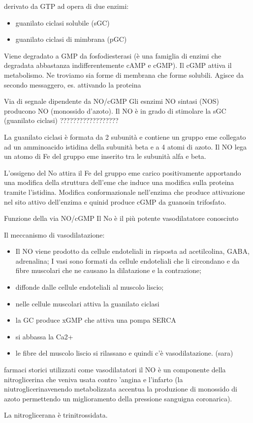 \documentclass[]{article}
\begin{document}
derivato da GTP ad opera di due enzimi:

\begin{itemize}
\itemsep1pt\parskip0pt
\item
  guanilato ciclasi solubile (sGC)
\item
  guanilato ciclasi di mimbrana (pGC)
\end{itemize}

Viene degradato a GMP da fosfodiesterasi (è una famiglia di enzimi che
degradata abbastanza indifferentemente cAMP e cGMP). Il cGMP attiva il
metabolismo. Ne troviamo sia forme di membrana che forme solubili.
Agisce da secondo messaggero, es. attivando la proteina

Via di segnale dipendente da NO/cGMP Gli esnzimi NO sintasi (NOS)
producono NO (monossido d'azoto). Il NO è in grado di stimolare la sGC
(guanilato ciclasi) ??????????????????

La guanilato ciclasi è formata da 2 subunità e contiene un gruppo eme
collegato ad un amminoacido istidina della subunità beta e a 4 atomi di
azoto. Il NO lega un atomo di Fe del gruppo eme inserito tra le subunità
alfa e beta.

L'ossigeno del No attira il Fe del gruppo eme carico positivamente
apportando una modifica della struttura dell'eme che induce una modifica
sulla proteina tramite l'istidina. Modifica conformazionale nell'enzima
che produce attivazione nel sito attivo dell'enzima e quinid produce
cGMP da guanosin trifosfato.

Funzione della via NO/cGMP Il No è il più potente vasodilatatore
conosciuto

Il meccanismo di vasodilatazione:

\begin{itemize}
\itemsep1pt\parskip0pt
\item
  Il NO viene prodotto da cellule endoteliali in risposta ad
  acetilcolina, GABA, adrenalina; I vasi sono formati da cellule
  endoteliali che li circondano e da fibre muscolari che ne causano la
  dilatazione e la contrazione;
\item
  diffonde dalle cellule endoteliali al muscolo liscio;
\item
  nelle cellule muscolari attiva la guanilato ciclasi
\item
  la GC produce xGMP che attiva una pompa SERCA
\item
  si abbassa la Ca2+
\item
  le fibre del muscolo liscio si rilassano e quindi c'è vasodilatazione.
  (sara)
\end{itemize}

farmaci storici utilizzati come vasodilatatori il NO è un componente
della nitroglicerina che veniva usata contro 'angina e l'infarto (la
niutroglicerinavenendo metabolizzata accentua la produzione di monossido
di azoto permettendo un miglioramento della pressione sanguigna
coronarica).

La nitroglicerana è trinitrossidata.
\end{document}
